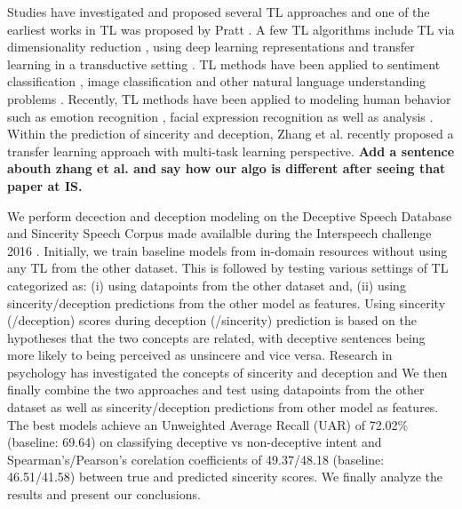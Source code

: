 \documentclass{article}
\begin{document}
Studies have investigated and proposed several TL approaches \cite{pan2010survey} and one of the earliest works in TL was proposed by Pratt \cite{pratt1993discriminability}.
A few TL algorithms include TL via dimensionality reduction \cite{pan2008transfer}, using deep learning representations \cite{bengio2012deep, mesnil2012unsupervised} and transfer learning in a transductive setting \cite{rohrbach2013transfer}.  
TL methods have been applied to sentiment classification \cite{blitzer2007biographies}, image classification \cite{wu2004improving} and other natural language understanding problems \cite{arnold2007comparative,blitzer2006domain}. 
Recently, TL methods have been applied to modeling human behavior such as emotion recognition \cite{zhang2016enhanced}, facial expression recognition \cite{chen2013learning} as well as analysis \cite{sangineto2014we}. 
Within the prediction of sincerity and deception, Zhang et al. \cite{zhang2016sinc} recently proposed a transfer learning approach with multi-task learning perspective.
{\bf Add a sentence abouth zhang et al. and say how our algo is different after seeing that paper at IS.} 


We perform decection and deception modeling on the Deceptive Speech Database and Sincerity Speech Corpus made availalble during the Interspeech challenge 2016 \cite{schuller2016interspeech}.
Initially, we train baseline models from in-domain resources without using any TL from the other dataset. 
This is followed by testing various settings of TL categorized as: (i) using datapoints from the other dataset and, (ii) using sincerity/deception predictions from the other model as features.
Using sincerity (/deception) scores during deception (/sincerity) prediction is based on the hypotheses that the two concepts are related, with deceptive sentences being more likely to being perceived as unsincere and vice versa. 
Research in psychology has investigated the concepts of sincerity and deception and  
We then finally combine the two approaches and test using datapoints from the other dataset as well as sincerity/deception predictions from other model as features.
The best models achieve an Unweighted Average Recall (UAR) of 72.02\% (baseline: 69.64) on classifying deceptive vs non-deceptive intent and Spearman's/Pearson's corelation coefficients of 49.37/48.18 (baseline: 46.51/41.58) between true and predicted sincerity scores.
We finally analyze the results and present our conclusions. 
\end{document}
